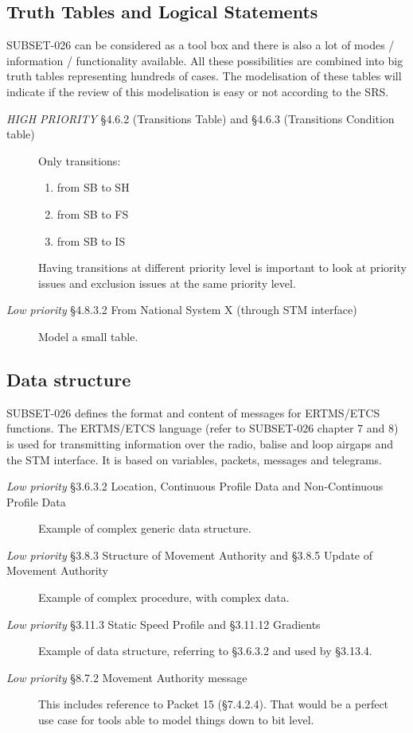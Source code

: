 \documentclass{template/openetcs_report}
\begin{document}
\subsection{Truth Tables and Logical Statements}
SUBSET-026 can be considered as a tool box and there is also a lot of modes / information / functionality available. All these possibilities are combined into big truth tables representing hundreds of cases. The modelisation of these tables will indicate if the review of this modelisation is easy or not according to the SRS.
\begin{description}
\item [\emph{HIGH PRIORITY} \S4.6.2 (Transitions Table) and \S4.6.3 (Transitions Condition table)] Only transitions:
 \begin{enumerate}
 \item from SB to SH
 \item from SB to FS
 \item from SB to IS
 \end{enumerate}
 Having transitions at different priority level is important to look at priority issues and exclusion issues at the same priority level.
\item [\emph{Low priority} \S4.8.3.2 From National System X (through STM interface)] Model a small table.
\end{description}


\subsection{Data structure}
SUBSET-026 defines the format and content of messages for ERTMS/ETCS functions. The ERTMS/ETCS language (refer to SUBSET-026 chapter 7 and 8) is used for transmitting information over the radio, balise and loop airgaps and the STM interface. It is based on variables, packets, messages and telegrams.
\begin{description}
\item [\emph{Low priority} \S3.6.3.2 Location, Continuous Profile Data and Non-Continuous Profile Data] Example of complex generic data structure.
\item [\emph{Low priority} \S3.8.3 Structure of Movement Authority and \S3.8.5 Update of Movement Authority] Example of complex procedure, with complex data.
\item [\emph{Low priority} \S3.11.3 Static Speed Profile and \S3.11.12 Gradients] Example of data structure, referring to \S3.6.3.2 and used by \S3.13.4.
\item [\emph{Low priority} \S8.7.2 Movement Authority message] This includes reference to Packet 15 (\S7.4.2.4). That would be a perfect use case for tools able to model things down to bit level.
\end{description}
\end{document}
